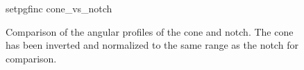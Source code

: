 \begin{figure}[ht]
\centering
{setpgfinc}
{cone_vs_notch}
\caption{Comparison of the angular profiles of the cone and notch.  The
cone has been inverted and normalized to the same range as the notch for
comparison.}
\label{fig:conevsnotch}
\end{figure}
